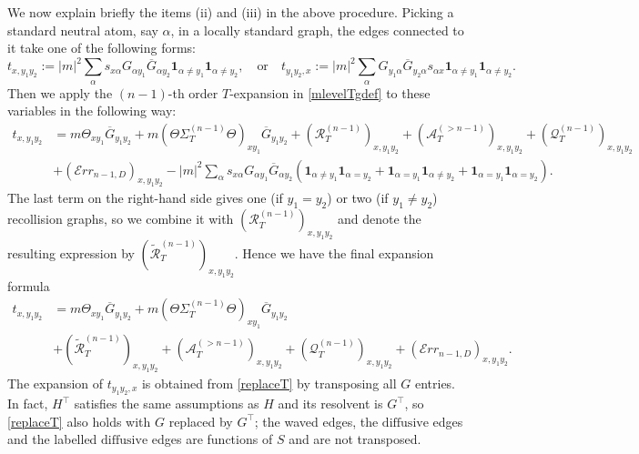 \documentclass{article}
\newcommand{\1}{\mathds{1}}
\numberwithin{equation}{section}
\newcommand{\al}{\alpha}
\newcommand{\be}{\begin{equation}}
\newcommand{\ee}{\end{equation}}
\newcommand{\dashed}{\text{diffusive}}
\theoremstyle{plain} %
\theoremstyle{remark}
\newcommand{\Sdelta}{{\Sigma}_T}
\newcommand{\PT}{\mathcal R_T}
\newcommand{\wtPT}{\widetilde{\mathcal R}_T}
\newcommand{\QT}{\mathcal Q_T}
\newcommand{\AT}{\mathcal A_T}
\newcommand{\Err}{{\mathcal Err}}
\begin{document}
We now explain briefly the items (ii) and (iii) in the above procedure. Picking a standard neutral atom, say $\al$, in a locally standard graph, the edges connected to it take one of the following forms:
\begin{equation}\label{12in4T}
	t_{x,y_1 y_2} :=|m|^2\sum_\al s_{x\al}G_{\al y_1}\overline G_{\al y_2}\mathbf 1_{\al\ne y_1}\mathbf 1_{\al\ne y_2},\quad \text{or}\quad t_{y_1y_2, x}:=|m|^2\sum_\al G_{ y_1\al }\overline G_{y_2 \al}s_{\al x}\mathbf 1_{\al\ne y_1}\mathbf 1_{\al\ne y_2} .
\end{equation}
Then we apply the $(n-1)$-th order $T$-expansion in \eqref{mlevelTgdef} to these variables in the following way: %
\begin{align*}
	  t_{x,y_1 y_2} & = m  \Theta_{xy_1}\overline G_{y_1y_2} +m (\Theta \Sdelta^{(n-1)}\Theta)_{xy_1} \overline G_{y_1y_2} + (\PT^{(n-1)})_{x,y_1 y_2} +  (\AT^{(>n-1)})_{x,y_1y_2}  + (\QT^{(n-1)})_{x,y_1y_2} \nonumber\\
	& +  (\Err_{n-1,D})_{x,y_1y_2}  - |m|^2\sum_\al s_{x\al}G_{\al y_1}\overline G_{\al y_2}\left(\mathbf 1_{\al\ne y_1}\mathbf 1_{\al = y_2}+\mathbf 1_{\al=y_1}\mathbf 1_{\al \ne y_2} +\mathbf 1_{\al = y_1}\mathbf 1_{\al = y_2}\right) .
\end{align*}
The last term on the right-hand side gives one (if $y_1=y_2$) or two (if $y_1\ne y_2$) recollision graphs, so we combine it with $ (\PT^{(n-1)})_{x,y_1 y_2} $ and denote the resulting expression by $(\wtPT^{(n-1)})_{x,y_1 y_2}$. Hence we have the final expansion formula 
\be\label{replaceT}
 \begin{split}
	t_{x,y_1 y_2} &=   m  \Theta_{xy_1}\overline G_{y_1y_2} +m   (\Theta \Sdelta^{(n-1)}\Theta)_{xy_1} \overline G_{y_1y_2} \\
	& +  (\wtPT^{(n-1)})_{x,y_1 y_2} +  (\AT^{(>n-1)})_{x,y_1y_2}  + (\QT^{(n-1)})_{x,y_1y_2} +  (\Err_{n-1,D})_{x,y_1y_2} .
\end{split}
\ee
The expansion of $t_{y_1y_2, x}$ is obtained from \eqref{replaceT} by transposing all $G$ entries. In fact, $H^\top$ satisfies the same assumptions as $H$ and its resolvent is $G^\top$, so \eqref{replaceT} also holds with $G$ replaced by $G^\top$; the waved edges, the $\dashed$ edges and the labelled $\dashed$ edges are functions of $S$ and are not transposed. 
\end{document}
